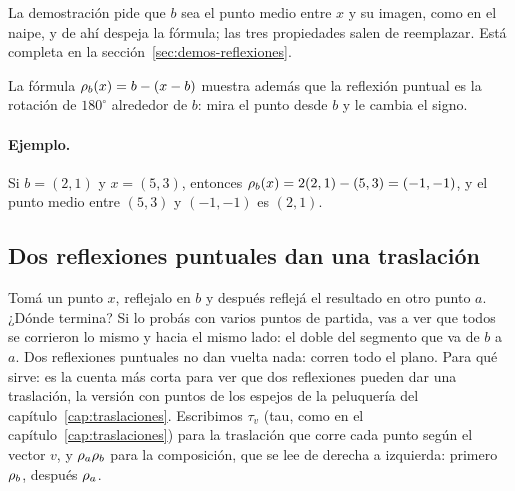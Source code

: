 La demostración pide que \(b\) sea el punto medio entre \(x\) y su imagen, como en el naipe, y
de ahí despeja la fórmula; las tres propiedades salen de reemplazar. Está completa en la
sección~\ref{sec:demos-reflexiones}.

La fórmula \(\rho_{b}(x)=b-(x-b)\) muestra además que la reflexión puntual es la rotación de
\(180^\circ\) alrededor de \(b\): mira el punto desde \(b\) y le cambia el signo.

\begin{center}
\end{center}

\paragraph{Ejemplo.}
Si \(b=(2,1)\) y \(x=(5,3)\), entonces \(\rho_{b}(x)=2(2,1)-(5,3)=(-1,-1)\), y el punto medio
entre \((5,3)\) y \((-1,-1)\) es \((2,1)\).

\subsection{Dos reflexiones puntuales dan una traslación}\label{sec:dos-puntuales}

Tomá un punto \(x\), reflejalo en \(b\) y después reflejá el resultado en otro punto \(a\).
¿Dónde termina? Si lo probás con varios puntos de partida, vas a ver que todos se corrieron lo
mismo y hacia el mismo lado: el doble del segmento que va de \(b\) a \(a\). Dos reflexiones
puntuales no dan vuelta nada: corren todo el plano. Para qué sirve: es la cuenta más corta para
ver que dos reflexiones pueden dar una traslación, la versión con puntos de los espejos de la
peluquería del capítulo~\ref{cap:traslaciones}. Escribimos \(\tau_v\) (tau, como en el capítulo~\ref{cap:traslaciones}) para la traslación que corre
cada punto según el vector \(v\), y \(\rho_{a}\rho_{b}\) para la composición, que se lee de
derecha a izquierda: primero \(\rho_{b}\), después \(\rho_{a}\).

